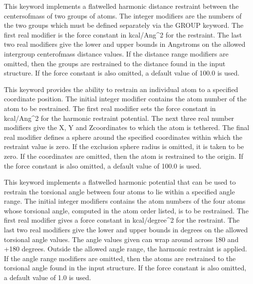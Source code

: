 \documentclass[letterpaper,11pt,english]{sphinxmanual}
\begin{document}
  This keyword implements a flat\sphinxhyphen{}welled harmonic distance restraint between the centers\sphinxhyphen{}of\sphinxhyphen{}mass of two groups of atoms. The integer modifiers are the numbers of the two groups which must be defined separately via the GROUP keyword. The first real modifier is the force constant in kcal/Ang\textasciicircum{}2 for the restraint. The last two real modifiers give the lower and upper bounds in Angstroms on the allowed intergroup center\sphinxhyphen{}of\sphinxhyphen{}mass distance values. If the distance range modifiers are omitted, then the groups are restrained to the distance found in the input structure. If the force constant is also omitted, a default value of 100.0 is used.

  This keyword provides the ability to restrain an individual atom to a specified coordinate position. The initial integer modifier contains the atom number of the atom to be restrained. The first real modifier sets the force constant in kcal/Ang\textasciicircum{}2 for the harmonic restraint potential. The next three real number modifiers give the X\sphinxhyphen{}, Y\sphinxhyphen{} and Z\sphinxhyphen{}coordinates to which the atom is tethered. The final real modifier defines a sphere around the specified coordinates within which the restraint value is zero. If the exclusion sphere radius is omitted, it is taken to be zero. If  the coordinates are omitted, then the atom is restrained to the origin. If the force constant is also omitted, a default value of 100.0 is used.

  This keyword implements a flat\sphinxhyphen{}welled harmonic potential that can be used to restrain the torsional angle between four atoms to lie within a specified angle range. The initial integer modifiers contains the atom numbers of the four atoms whose torsional angle, computed in the atom order listed, is to be restrained. The first real modifier gives a force constant in kcal/degree\textasciicircum{}2 for the restraint. The last two real modifiers give the lower and upper bounds in degrees on the allowed torsional angle values. The angle values given can wrap around across \sphinxhyphen{}180 and +180 degrees. Outside the allowed angle range, the harmonic restraint is applied. If the angle range modifiers are omitted, then the atoms are restrained to the torsional angle found in the input structure. If the force constant is also omitted, a default value of 1.0 is used.
\end{document}
